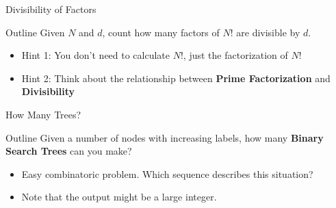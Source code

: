 \begin{frame}{Divisibility of Factors}
  \begin{block}{Outline}
    Given $N$ and $d$, count how many factors of $N!$ are divisible by $d$.
  \end{block}\bigskip

  \begin{itemize}
    \item Hint 1: You don't need to calculate $N!$, just the factorization of $N!$
    \item Hint 2: Think about the relationship between {\bf Prime Factorization} and {\bf Divisibility}
  \end{itemize}
\end{frame}

%

\begin{frame}{How Many Trees?}
  \begin{block}{Outline}
    Given a number of nodes with increasing labels, how many {\bf Binary Search Trees} can you make?
  \end{block}\bigskip

  \begin{itemize}
    \item Easy combinatoric problem. Which sequence describes this situation?
    \item Note that the output might be a large integer.
  \end{itemize}
\end{frame}

